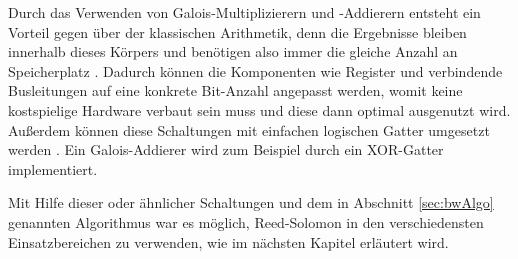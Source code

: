 Durch das Verwenden von Galois-Multiplizierern und -Addierern entsteht ein Vorteil gegen über der klassischen Arithmetik, denn die Ergebnisse bleiben innerhalb dieses Körpers und benötigen also immer die gleiche Anzahl an Speicherplatz \cite{weitzKonkreteMathematikNicht2021}.
Dadurch können die Komponenten wie Register und verbindende Busleitungen auf eine konkrete Bit-Anzahl angepasst werden, womit keine kostspielige Hardware verbaut sein muss und diese dann optimal ausgenutzt wird.
Außerdem können diese Schaltungen mit einfachen logischen Gatter umgesetzt werden \cite{biernatHardwareImplementationReedSolomon2010, southwellIntroductionErrorDetection}.
Ein Galois-Addierer wird zum Beispiel durch ein XOR-Gatter implementiert.

Mit Hilfe dieser oder ähnlicher Schaltungen und dem in Abschnitt \ref{sec:bwAlgo} genannten Algorithmus war es möglich, Reed-Solomon in den verschiedensten Einsatzbereichen zu verwenden, wie im nächsten Kapitel erläutert wird.